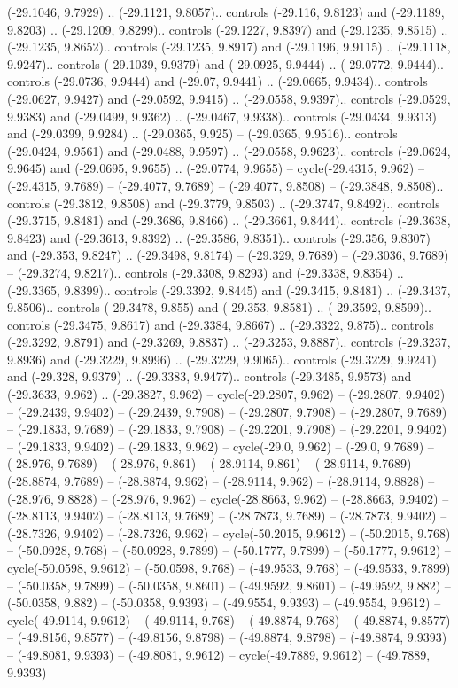 \begin{scope}[shift={(2.5552, 9.9912)}]
\begin{scope}[shift={(48.1654, -14.8546)}]
(-29.1046, 9.7929) .. (-29.1121, 9.8057).. controls (-29.116, 9.8123) and (-29.1189, 9.8203) .. (-29.1209, 9.8299).. controls (-29.1227, 9.8397) and (-29.1235, 9.8515) .. (-29.1235, 9.8652).. controls (-29.1235, 9.8917) and (-29.1196, 9.9115) .. (-29.1118, 9.9247).. controls (-29.1039, 9.9379) and (-29.0925, 9.9444) .. (-29.0772, 9.9444).. controls (-29.0736, 9.9444) and (-29.07, 9.9441) .. (-29.0665, 9.9434).. controls (-29.0627, 9.9427) and (-29.0592, 9.9415) .. (-29.0558, 9.9397).. controls (-29.0529, 9.9383) and (-29.0499, 9.9362) .. (-29.0467, 9.9338).. controls (-29.0434, 9.9313) and (-29.0399, 9.9284) .. (-29.0365, 9.925) -- (-29.0365, 9.9516).. controls (-29.0424, 9.9561) and (-29.0488, 9.9597) .. (-29.0558, 9.9623).. controls (-29.0624, 9.9645) and (-29.0695, 9.9655) .. (-29.0774, 9.9655) -- cycle(-29.4315, 9.962) -- (-29.4315, 9.7689) -- (-29.4077, 9.7689) -- (-29.4077, 9.8508) -- (-29.3848, 9.8508).. controls (-29.3812, 9.8508) and (-29.3779, 9.8503) .. (-29.3747, 9.8492).. controls (-29.3715, 9.8481) and (-29.3686, 9.8466) .. (-29.3661, 9.8444).. controls (-29.3638, 9.8423) and (-29.3613, 9.8392) .. (-29.3586, 9.8351).. controls (-29.356, 9.8307) and (-29.353, 9.8247) .. (-29.3498, 9.8174) -- (-29.329, 9.7689) -- (-29.3036, 9.7689) -- (-29.3274, 9.8217).. controls (-29.3308, 9.8293) and (-29.3338, 9.8354) .. (-29.3365, 9.8399).. controls (-29.3392, 9.8445) and (-29.3415, 9.8481) .. (-29.3437, 9.8506).. controls (-29.3478, 9.855) and (-29.353, 9.8581) .. (-29.3592, 9.8599).. controls (-29.3475, 9.8617) and (-29.3384, 9.8667) .. (-29.3322, 9.875).. controls (-29.3292, 9.8791) and (-29.3269, 9.8837) .. (-29.3253, 9.8887).. controls (-29.3237, 9.8936) and (-29.3229, 9.8996) .. (-29.3229, 9.9065).. controls (-29.3229, 9.9241) and (-29.328, 9.9379) .. (-29.3383, 9.9477).. controls (-29.3485, 9.9573) and (-29.3633, 9.962) .. (-29.3827, 9.962) -- cycle(-29.2807, 9.962) -- (-29.2807, 9.9402) -- (-29.2439, 9.9402) -- (-29.2439, 9.7908) -- (-29.2807, 9.7908) -- (-29.2807, 9.7689) -- (-29.1833, 9.7689) -- (-29.1833, 9.7908) -- (-29.2201, 9.7908) -- (-29.2201, 9.9402) -- (-29.1833, 9.9402) -- (-29.1833, 9.962) -- cycle(-29.0, 9.962) -- (-29.0, 9.7689) -- (-28.976, 9.7689) -- (-28.976, 9.861) -- (-28.9114, 9.861) -- (-28.9114, 9.7689) -- (-28.8874, 9.7689) -- (-28.8874, 9.962) -- (-28.9114, 9.962) -- (-28.9114, 9.8828) -- (-28.976, 9.8828) -- (-28.976, 9.962) -- cycle(-28.8663, 9.962) -- (-28.8663, 9.9402) -- (-28.8113, 9.9402) -- (-28.8113, 9.7689) -- (-28.7873, 9.7689) -- (-28.7873, 9.9402) -- (-28.7326, 9.9402) -- (-28.7326, 9.962) -- cycle(-50.2015, 9.9612) -- (-50.2015, 9.768) -- (-50.0928, 9.768) -- (-50.0928, 9.7899) -- (-50.1777, 9.7899) -- (-50.1777, 9.9612) -- cycle(-50.0598, 9.9612) -- (-50.0598, 9.768) -- (-49.9533, 9.768) -- (-49.9533, 9.7899) -- (-50.0358, 9.7899) -- (-50.0358, 9.8601) -- (-49.9592, 9.8601) -- (-49.9592, 9.882) -- (-50.0358, 9.882) -- (-50.0358, 9.9393) -- (-49.9554, 9.9393) -- (-49.9554, 9.9612) -- cycle(-49.9114, 9.9612) -- (-49.9114, 9.768) -- (-49.8874, 9.768) -- (-49.8874, 9.8577) -- (-49.8156, 9.8577) -- (-49.8156, 9.8798) -- (-49.8874, 9.8798) -- (-49.8874, 9.9393) -- (-49.8081, 9.9393) -- (-49.8081, 9.9612) -- cycle(-49.7889, 9.9612) -- (-49.7889, 9.9393) 
\end{scope}
\end{scope}
